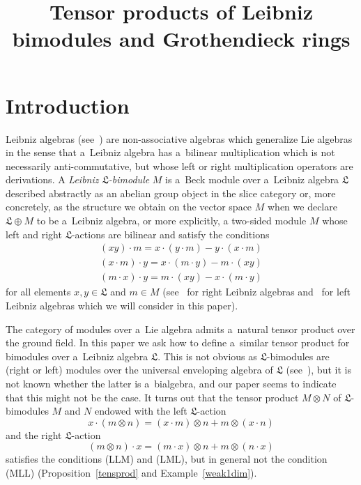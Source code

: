 \documentclass{jonasart}
\title{Tensor products of Leibniz bimodules and Grothendieck rings}
\newcommand{\lf}{\mathfrak{L}}
\begin{document}
	\section{Introduction}

	Leibniz algebras (see~\cite{L, CH, LP1}) are non-associative algebras which generalize Lie algebras in the sense that a~Leibniz algebra has a~bilinear multiplication which is not necessarily anti-commutative, but whose left or right multiplication operators are derivations. A \textit{Leibniz
	$\lf$-bimodule\/} $M$ is a~Beck module over a~Leibniz algebra $\lf$
	described abstractly as an abelian group object in the slice category or, more concretely, as the structure we obtain on the vector space $M$
	when we declare $\lf\oplus M$ to be a~Leibniz algebra, or more explicitly, a two-sided module $M$ whose left and right $\lf$-actions are bilinear and satisfy the conditions
	\begin{gather}
		\tag{LLM}
        (xy)\cdot m=x\cdot(y\cdot m)-y\cdot(x\cdot m) \\
		\tag{LML}
        (x\cdot m)\cdot y=x\cdot(m\cdot y)-m\cdot(xy) \\
		\tag{MLL}
        (m\cdot x)\cdot y=m\cdot(xy)-x\cdot(m\cdot y)
	\end{gather}
	for all elements $x,y\in\lf$ and $m\in M$ (see~\cite{LP1} for right Leibniz algebras and~\cite{F1} for left Leibniz algebras which we will consider in this paper).

\medskip 

	The category of modules over a~Lie algebra admits a~natural tensor product over the ground field. In this paper we ask how to define a~similar tensor product for bimodules over a~Leibniz algebra $\lf$. This is not obvious as $\lf$-bimodules are (right or left) modules over the universal enveloping algebra of $\lf$ (see~\cite{LP1}), but it is not known whether the latter is a~bialgebra, and our paper seems to indicate that this might not be the case. It turns out that the tensor product $M\otimes N$ of $\lf$-bimodules $M$ and $N$ endowed with the left $\lf$-action
	\[
		x\cdot(m\otimes n)=(x\cdot m)\otimes n+m\otimes(x\cdot n)
	\]
	and the right $\lf$-action
	\[
		(m\otimes n)\cdot x=(m\cdot x)\otimes n+m\otimes(n\cdot x)
	\]
	satisfies the conditions (LLM) and (LML), but in general not the condition (MLL) (Proposition~\ref{tensprod} and Example~\ref{weak1dim}).
\medskip 
\end{document}
